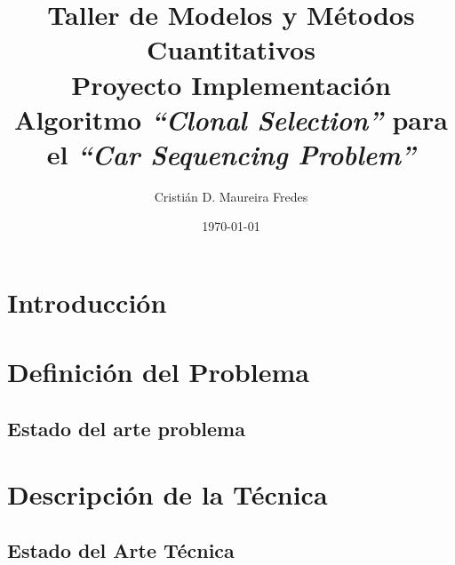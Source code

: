 \documentclass[letter, 10pt]{article}
\begin{document}

\pagestyle{empty}



\title{
Taller de Modelos y Métodos Cuantitativos \\
\Large{
Proyecto Implementación Algoritmo \emph{``Clonal Selection''} para el \emph{``Car Sequencing Problem''}
}
}
\author{Cristián D. Maureira Fredes}
\date{\today}
\maketitle

\section{Introducción}


\section{Definición del Problema}


\subsection{Estado del arte problema}


\section{Descripción de la Técnica}


\subsection{Estado del Arte Técnica}

\end{document}
